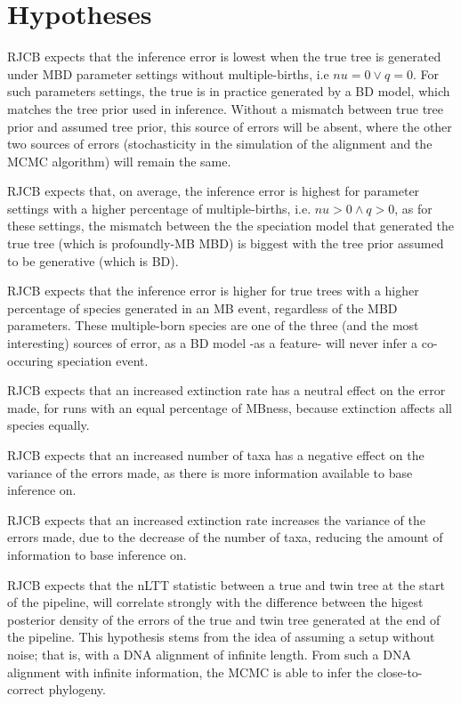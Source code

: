 \section{Hypotheses}

RJCB expects that the inference error is lowest when the true
tree is generated under MBD parameter settings without multiple-births, i.e
$nu = 0 \vee q = 0$. For such parameters settings, the
true is in practice generated by a BD model, which
matches the tree prior used in inference. Without a mismatch between
true tree prior and assumed tree prior, this source of errors will be absent,
where the other two sources of errors (stochasticity in the
simulation of the alignment and the MCMC algorithm) 
will remain the same.

RJCB expects that, on average, the inference error is highest for
parameter settings with a higher percentage of multiple-births,
i.e. $nu > 0 \wedge q > 0$, as for these settings, 
the mismatch between the the speciation model that
generated the true tree (which is profoundly-MB MBD) is biggest with
the tree prior assumed to be generative (which is BD).

RJCB expects that the inference error is higher for true trees
with a higher percentage of species generated in an MB event,
regardless of the MBD parameters.
These multiple-born species are one of the three (and the most 
interesting) sources of error, as a BD model -as a feature- will never
infer a co-occuring speciation event.

RJCB expects that an increased extinction rate
has a neutral effect on the error made, 
for runs with an equal percentage of MBness,
because extinction affects all species equally. 

RJCB expects that an increased number of taxa
has a negative effect on the variance of the errors made, as there
is more information available to base inference on.

RJCB expects that an increased extinction rate
increases the variance of the errors made,
due to the decrease of the number of taxa, reducing the amount of information
to base inference on.

RJCB expects that the nLTT statistic between a true and twin
tree at the start of the pipeline,
will correlate strongly with the difference
between the higest posterior density of the 
errors of the true and twin tree 
generated at the end of the pipeline. 
This hypothesis
stems from the idea of assuming a setup without noise; that is, with
a DNA alignment of infinite length. From such a DNA alignment 
with infinite information, the MCMC
is able to infer the close-to-correct phylogeny.

